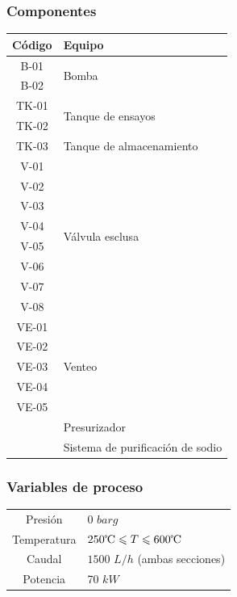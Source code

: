 \documentclass{article}
\begin{document}
\subsubsection*{Componentes}
\begin{table}[H]
\centering
\begin{tabular}{cp{3.5cm}}
\toprule
Código & Equipo \\
\midrule
B-01 & \multirow{2}{*}{Bomba} \\
B-02 & \\
\midrule
TK-01 & \multirow{2}{*}{Tanque de ensayos} \\
TK-02 & \\
\midrule
TK-03 & Tanque de \newline almacenamiento \\
\midrule
V-01 & \multirow{8}{*}{Válvula esclusa} \\
V-02 & \\
V-03 & \\
V-04 & \\
V-05 & \\
V-06 & \\
V-07 & \\
V-08 & \\
\midrule
VE-01 & \multirow{5}{*}{Venteo} \\
VE-02 & \\
VE-03 & \\
VE-04 & \\
VE-05 & \\
\midrule
& Presurizador \\
\midrule
& Sistema de purificación de sodio \\
\bottomrule
\end{tabular}
\end{table}
\subsubsection*{Variables de proceso}
\begin{table}[H]
\centering
\begin{tabular}{cp{3.5cm}}
\toprule
Presión & 0 $barg$ \\
Temperatura & $250\celsius\leqslant T \leqslant 600\celsius$ \\
Caudal & $1500$ $L/h$ (ambas \newline secciones) \\
Potencia & 70 $kW$ \\
\bottomrule
\end{tabular}
\end{table}
\end{document}
